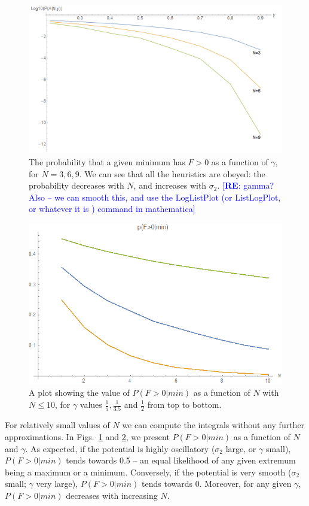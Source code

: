 \documentclass[12pt]{article}
\newcommand{\re}[1]{\textcolor{blue}{[{\bf RE}: #1]}}
\begin{document}
\begin{figure}
  \centering
  \includegraphics[width=\linewidth]{N369.png}
  \caption{The probability that a given minimum has $F > 0$ as a function of $\gamma$, for $N=3, 6, 9$. We can see that all the heuristics are obeyed: the probability decreases with $N$, and increases with $\sigma_2$. \re{gamma?  Also -- we can smooth this, and use the LogListPlot (or ListLogPlot, or whatever it is ) command in mathematica}}
  \label{N6}
\end{figure}

\begin{figure}
  \centering
    \includegraphics[width=\linewidth]{PVaryingWithN.png}
  \caption{A plot showing the value of $P(F>0|min)$ as a function of $N$ with $N\le10$, for $\gamma$ values $\frac{1}{5}, \frac{1}{3.5}$ and $\frac{1}{2}$ from top to bottom.}
  \label{gamma}
\end{figure}

For relatively small values of $N$ we can compute the integrals without any further approximations.   In Figs.~\ref{N6} and \ref{gamma}, we present $P(F>0|min)$ as a function of $N$ and $\gamma$. As expected, if the potential is highly oscillatory ($\sigma_2$ large, or $\gamma$ small), $P(F>0|min)$  tends towards 0.5 --  an equal likelihood of any given extremum being a maximum or a minimum. Conversely, if the potential is very smooth ($\sigma_2$ small; $\gamma$ very large), $P(F>0|min)$  tends towards 0. Moreover, for any given $\gamma$, $P(F>0|min)$ decreases with increasing $N$. 
 
\end{document}
